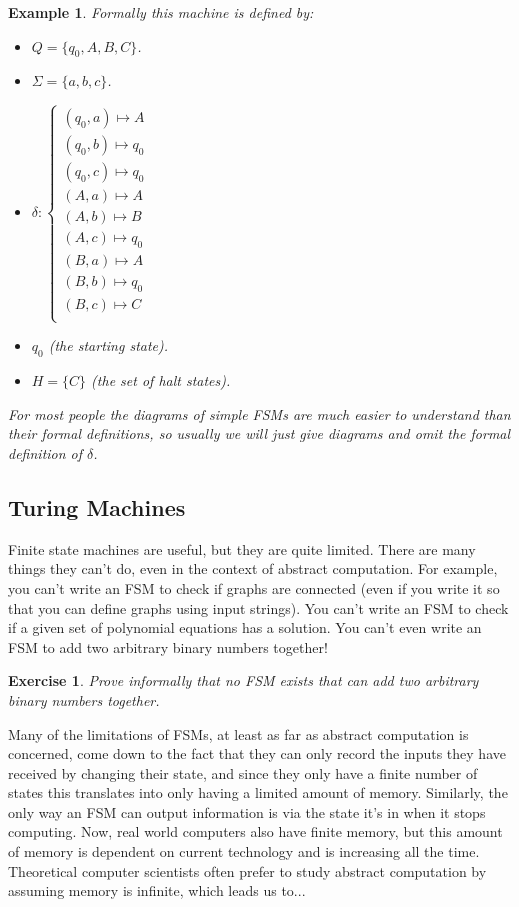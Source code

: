 \documentclass{article}
\theoremstyle{plain}
\newtheorem{example}[theorem]{Example}{\bfseries}{\upshape}
\newtheorem{exercise}[theorem]{Exercise}{\bfseries}{\upshape}
\begin{document}
\begin{example}
Formally this machine is defined by:
\begin{itemize}
\item $Q=\{q_0,A,B,C\}$.
\item $\Sigma=\{a,b,c\}$.
\item $\delta:\begin{cases}
(q_0,a)\mapsto A\\
(q_0,b)\mapsto q_0\\
(q_0,c)\mapsto q_0\\
(A,a)\mapsto A\\
(A,b)\mapsto B\\
(A,c)\mapsto q_0\\
(B,a)\mapsto A\\
(B,b)\mapsto q_0\\
(B,c)\mapsto C\\
 \end{cases}$
\item $q_0$ (the starting state).
\item $H=\{C\}$ (the set of halt states).
\end{itemize}
For most people the diagrams of simple FSMs are much easier to understand than their formal definitions, so usually we will just give diagrams and omit the formal definition of $\delta$. 
\end{example}
        


\subsection{Turing Machines}
Finite state machines are useful, but they are quite limited. There are many things they can't do, even in the context of abstract computation. For example, you can't write an FSM to check if graphs are connected (even if you write it so that you can define graphs using input strings). You can't write an FSM to check if a given set of polynomial equations has a solution. You can't even write an FSM to add two arbitrary binary numbers together!

\begin{exercise}
Prove informally that no FSM exists that can add two arbitrary binary numbers together. 
\end{exercise}

Many of the limitations of FSMs, at least as far as abstract computation is concerned, come down to the fact that they can only record the inputs they have received by changing their state, and since they only have a finite number of states this translates into only having a limited amount of memory. Similarly, the only way an FSM can output information is via the state it's in when it stops computing. Now, real world computers also have finite memory, but this amount of memory is dependent on current technology and is increasing all the time. Theoretical computer scientists often prefer to study abstract computation by assuming memory is infinite, which leads us to...
\end{document}
